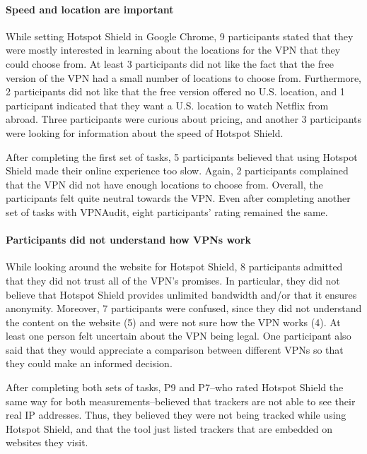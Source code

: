 \paragraph{Speed and location are important}

While setting Hotspot Shield in Google Chrome, 9 participants stated that they were mostly interested in learning about the locations for the VPN that they could choose from. At least 3 participants did not like the fact that the free version of the VPN had a small number of locations to choose from. Furthermore, 2 participants did not like that the free version offered no U.S. location, and 1 participant indicated that they want a U.S. location to watch Netflix from abroad. Three participants were curious about pricing, and another 3 participants were looking for information about the speed of Hotspot Shield.

After completing the first set of tasks, 5 participants believed that using Hotspot Shield made their online experience too slow. Again, 2 participants complained that the VPN did not have enough locations to choose from. Overall, the participants felt quite neutral towards the VPN.
Even after completing another set of tasks with VPNAudit, eight participants' rating remained the same. 

\paragraph{Participants did not understand how VPNs work}

While looking around the website for Hotspot Shield, 8 participants admitted that they did not trust all of the VPN's promises. In particular, they did not believe
that Hotspot Shield provides unlimited bandwidth and/or that it ensures anonymity.
Moreover, 7 participants were confused, since they did not understand the content
on the website (5) and were not sure how the VPN works (4). At least one person
felt uncertain about the VPN being legal. One participant also said that
they would appreciate a comparison between different VPNs so that they could make an
informed decision.

After completing both sets of tasks, P9 and P7--who rated Hotspot Shield the same way for both measurements--believed that trackers are not able to see their real IP
addresses. Thus, they believed they were not being tracked while using Hotspot Shield, and that the tool just listed trackers that are embedded on websites they visit. 

